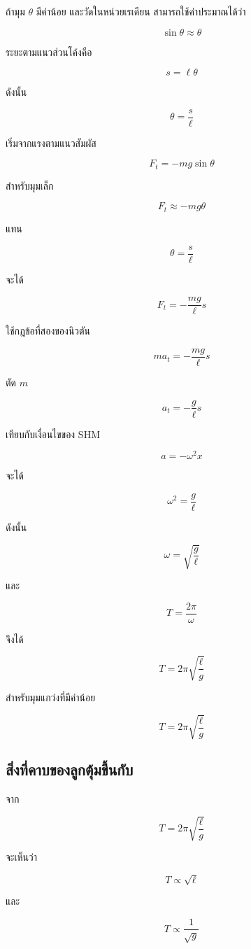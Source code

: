 ถ้ามุม $\theta$ มีค่าน้อย และวัดในหน่วยเรเดียน สามารถใช้ค่าประมาณได้ว่า

\[
\sin\theta\approx\theta
\]

ระยะตามแนวส่วนโค้งคือ

\[
s=\ell\theta
\]

ดังนั้น

\[
\theta=\frac{s}{\ell}
\]

เริ่มจากแรงตามแนวสัมผัส

\[
F_t=-mg\sin\theta
\]

สำหรับมุมเล็ก

\[
F_t\approx -mg\theta
\]

แทน

\[
\theta=\frac{s}{\ell}
\]

จะได้

\[
F_t=-\frac{mg}{\ell}s
\]

ใช้กฎข้อที่สองของนิวตัน

\[
ma_t=-\frac{mg}{\ell}s
\]

ตัด $m$

\[
a_t=-\frac{g}{\ell}s
\]

เทียบกับเงื่อนไขของ SHM

\[
a=-\omega^2x
\]

จะได้

\[
\omega^2=\frac{g}{\ell}
\]

ดังนั้น

\[
\omega=\sqrt{\frac{g}{\ell}}
\]

และ

\[
T=\frac{2\pi}{\omega}
\]

จึงได้

\[
T=2\pi\sqrt{\frac{\ell}{g}}
\]

\begin{tcolorbox}[title=คาบของลูกตุ้มอย่างง่าย]
สำหรับมุมแกว่งที่มีค่าน้อย

\[
T=2\pi\sqrt{\frac{\ell}{g}}
\]
\end{tcolorbox}

\subsection{สิ่งที่คาบของลูกตุ้มขึ้นกับ}

จาก

\[
T=2\pi\sqrt{\frac{\ell}{g}}
\]

จะเห็นว่า

\[
T\propto \sqrt{\ell}
\]

และ

\[
T\propto \frac{1}{\sqrt{g}}
\]

